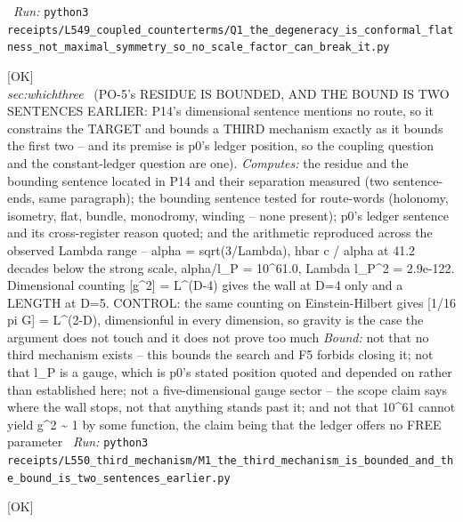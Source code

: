 \begin{description}
\ \emph{Run:} \texttt{python3 receipts/L549\_coupled\_counterterms/Q1\_the\_degeneracy\_is\_conformal\_flatness\_not\_maximal\_symmetry\_so\_no\_scale\_factor\_can\_break\_it.py}
\item[\label{rcpt:M1_the_third_mechanism_is_bounded_and_the_bound_is_two_sentences_earlier}\texttt{M1\_the\_third\_mechanism\_is\_bounded\_and\_the\_bound\_is\_two\_sentences\_earlier}]\hfill\textsf{[OK]}\\
\textit{sec:whichthree} \ (PO-5's RESIDUE IS BOUNDED, AND THE BOUND IS TWO SENTENCES EARLIER: P14's dimensional sentence mentions no route, so it constrains the TARGET and bounds a THIRD mechanism exactly as it bounds the first two -- and its premise is p0's ledger position, so the coupling question and the constant-ledger question are one). 
\emph{Computes:} the residue and the bounding sentence located in P14 and their separation measured (two sentence-ends, same paragraph); the bounding sentence tested for route-words (holonomy, isometry, flat, bundle, monodromy, winding -- none present); p0's ledger sentence and its cross-register reason quoted; and the arithmetic reproduced across the observed Lambda range -- alpha = sqrt(3/Lambda), hbar c / alpha at 41.2 decades below the strong scale, alpha/l\_P = 10\textasciicircum{}61.0, Lambda l\_P\textasciicircum{}2 = 2.9e-122. Dimensional counting [g\textasciicircum{}2] = L\textasciicircum{}(D-4) gives the wall at D=4 only and a LENGTH at D=5. CONTROL: the same counting on Einstein-Hilbert gives [1/16 pi G] = L\textasciicircum{}(2-D), dimensionful in every dimension, so gravity is the case the argument does not touch and it does not prove too much
 \emph{Bound:} not that no third mechanism exists -- this bounds the search and F5 forbids closing it; not that l\_P is a gauge, which is p0's stated position quoted and depended on rather than established here; not a five-dimensional gauge sector -- the scope claim says where the wall stops, not that anything stands past it; and not that 10\textasciicircum{}61 cannot yield g\textasciicircum{}2 \textasciitilde{} 1 by some function, the claim being that the ledger offers no FREE parameter
\ \emph{Run:} \texttt{python3 receipts/L550\_third\_mechanism/M1\_the\_third\_mechanism\_is\_bounded\_and\_the\_bound\_is\_two\_sentences\_earlier.py}
\item[\label{rcpt:R1_a_protected_row_was_corrupt_for_368_commits_and_the_corruption_satisfied_a_gate}\texttt{R1\_a\_protected\_row\_was\_corrupt\_for\_368\_commits\_and\_the\_corruption\_satisfied\_a\_gate}]\hfill\textsf{[OK]}\\

\end{description}
